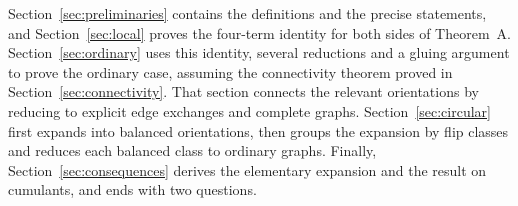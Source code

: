 Section~\ref{sec:preliminaries} contains the definitions and the precise
statements, and Section~\ref{sec:local} proves the four-term identity for both
sides of Theorem~A.
Section~\ref{sec:ordinary} uses this identity, several reductions and a gluing
argument to prove the ordinary case, assuming the connectivity theorem proved
in Section~\ref{sec:connectivity}.
That section connects the relevant orientations by reducing to explicit edge
exchanges and complete graphs.
Section~\ref{sec:circular} first expands into balanced orientations, then groups
the expansion by flip classes and reduces each balanced class to ordinary
graphs.
Finally, Section~\ref{sec:consequences} derives the elementary expansion and the
result on cumulants, and ends with two questions.
